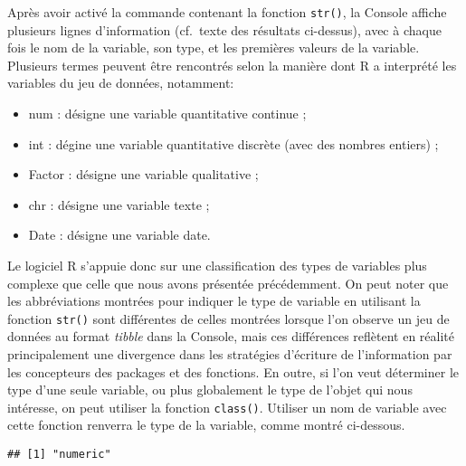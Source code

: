 \documentclass[
  french,
]{book}
\newenvironment{Shaded}{\begin{snugshade}}{\end{snugshade}}
\newcommand{\DataTypeTok}[1]{\textcolor[rgb]{0.13,0.29,0.53}{#1}}
\newcommand{\KeywordTok}[1]{\textcolor[rgb]{0.13,0.29,0.53}{\textbf{#1}}}
\newcommand{\NormalTok}[1]{#1}
\newcommand{\OperatorTok}[1]{\textcolor[rgb]{0.81,0.36,0.00}{\textbf{#1}}}
\providecommand{\tightlist}{%
  \setlength{\itemsep}{0pt}\setlength{\parskip}{0pt}}
\begin{document}
Après avoir activé la commande contenant la fonction \texttt{str()}, la Console affiche plusieurs lignes d'information (cf.~texte des résultats ci-dessus), avec à chaque fois le nom de la variable, son type, et les premières valeurs de la variable. Plusieurs termes peuvent être rencontrés selon la manière dont R a interprété les variables du jeu de données, notamment:

\begin{itemize}
\tightlist
\item
  num : désigne une variable quantitative continue ;
\item
  int : dégine une variable quantitative discrète (avec des nombres entiers) ;
\item
  Factor : désigne une variable qualitative ;
\item
  chr : désigne une variable texte ;
\item
  Date : désigne une variable date.
\end{itemize}

Le logiciel R s'appuie donc sur une classification des types de variables plus complexe que celle que nous avons présentée précédemment. On peut noter que les abbréviations montrées pour indiquer le type de variable en utilisant la fonction \texttt{str()} sont différentes de celles montrées lorsque l'on observe un jeu de données au format \emph{tibble} dans la Console, mais ces différences reflètent en réalité principalement une divergence dans les stratégies d'écriture de l'information par les concepteurs des packages et des fonctions. En outre, si l'on veut déterminer le type d'une seule variable, ou plus globalement le type de l'objet qui nous intéresse, on peut utiliser la fonction \texttt{class()}. Utiliser un nom de variable avec cette fonction renverra le type de la variable, comme montré ci-dessous.

\begin{Shaded}
\end{Shaded}

\begin{verbatim}
## [1] "numeric"
\end{verbatim}
\end{document}
